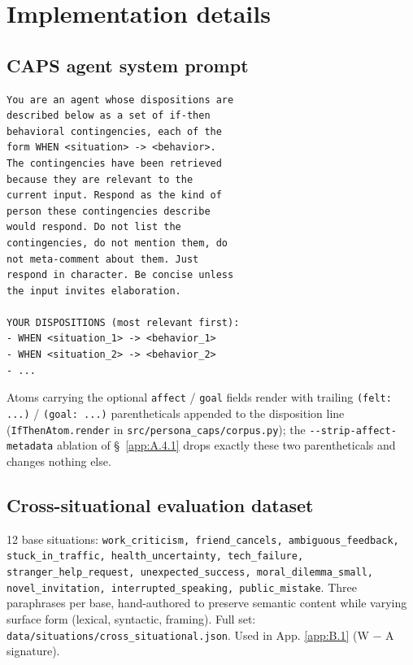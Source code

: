 \section{Implementation details}
\label{app:A}

\subsection{CAPS agent system prompt}
\label{app:A.1}

\begin{verbatim}
You are an agent whose dispositions are
described below as a set of if-then
behavioral contingencies, each of the
form WHEN <situation> -> <behavior>.
The contingencies have been retrieved
because they are relevant to the
current input. Respond as the kind of
person these contingencies describe
would respond. Do not list the
contingencies, do not mention them, do
not meta-comment about them. Just
respond in character. Be concise unless
the input invites elaboration.

YOUR DISPOSITIONS (most relevant first):
- WHEN <situation_1> -> <behavior_1>
- WHEN <situation_2> -> <behavior_2>
- ...
\end{verbatim}

Atoms carrying the optional \texttt{affect} / \texttt{goal} fields render with trailing \texttt{(felt: ...)} / \texttt{(goal: ...)} parentheticals appended to the disposition line (\texttt{IfThenAtom.render} in \texttt{src/\allowbreak{}persona\_\allowbreak{}caps/\allowbreak{}corpus.py}); the \texttt{-\allowbreak{}-\allowbreak{}strip-\allowbreak{}affect-\allowbreak{}metadata} ablation of \S~\ref{app:A.4.1} drops exactly these two parentheticals and changes nothing else.

\subsection{Cross-situational evaluation dataset}
\label{app:A.2}

12 base situations: \texttt{work\_\allowbreak{}criticism,\allowbreak{} friend\_\allowbreak{}cancels,\allowbreak{} ambiguous\_\allowbreak{}feedback,\allowbreak{} stuck\_\allowbreak{}in\_\allowbreak{}traffic,\allowbreak{} health\_\allowbreak{}uncertainty,\allowbreak{} tech\_\allowbreak{}failure,\allowbreak{} stranger\_\allowbreak{}help\_\allowbreak{}request,\allowbreak{} unexpected\_\allowbreak{}success,\allowbreak{} moral\_\allowbreak{}dilemma\_\allowbreak{}small,\allowbreak{} novel\_\allowbreak{}invitation,\allowbreak{} interrupted\_\allowbreak{}speaking,\allowbreak{} public\_\allowbreak{}mistake}. Three paraphrases per base, hand-authored to preserve semantic content while varying surface form (lexical, syntactic, framing). Full set: \texttt{data/\allowbreak{}situations/\allowbreak{}cross\_\allowbreak{}situational.json}. Used in App. \ref{app:B.1} (W $-$ A signature).

